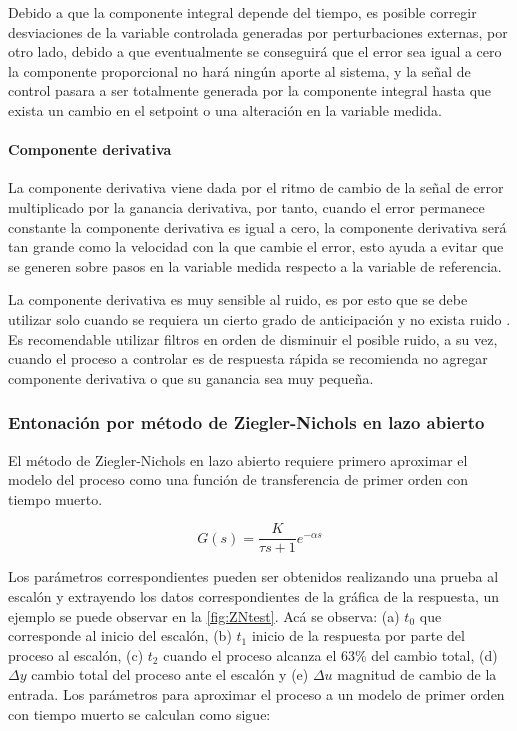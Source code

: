 				Debido a que la componente integral depende del tiempo, es posible corregir desviaciones de la variable controlada generadas por perturbaciones externas, por otro lado, debido a que eventualmente se conseguirá que el error sea igual a cero la componente proporcional no hará ningún aporte al sistema, y la señal de control pasara a ser totalmente generada por la componente integral hasta que exista un cambio en el setpoint o una alteración en la variable medida.

			\paragraph{Componente derivativa}

				La componente derivativa viene dada por el ritmo de cambio de la señal de error multiplicado por la ganancia derivativa, por tanto, cuando el error permanece constante la componente derivativa es igual a cero, la componente derivativa será tan grande como la velocidad con la que cambie el error, esto ayuda a evitar que se generen sobre pasos en la variable medida respecto a la variable de referencia.
				
				La componente derivativa es muy sensible al ruido, es por esto que se debe utilizar solo cuando se requiera un cierto grado de anticipación y no exista ruido \Parencite{smith1985principles}. Es recomendable utilizar filtros en orden de disminuir el posible ruido, a su vez, cuando el proceso a controlar es de respuesta rápida se recomienda no agregar componente derivativa o que su ganancia sea muy pequeña.
				
		\subsubsection{Entonación por método de Ziegler-Nichols en lazo abierto}
			
			El método de Ziegler-Nichols en lazo abierto requiere primero aproximar el modelo del proceso como una función de transferencia de primer orden con tiempo muerto.
			
			\begin{equation}\label{eq:firstorderProcess}
				G(s) = \frac{K}{\tau s + 1} e^{-\alpha s}
			\end{equation}
			
			Los parámetros correspondientes pueden ser obtenidos realizando una prueba al escalón y extrayendo los datos correspondientes de la gráfica de la respuesta, un ejemplo se puede observar en la \cref{fig:ZNtest}. Acá se observa: (a) $t_{0}$ que corresponde al inicio del escalón, (b) $t_{1}$ inicio de la respuesta por parte del proceso al escalón, (c) $t_{2}$ cuando el proceso alcanza el 63\% del cambio total, (d) $\Delta y$ cambio total del proceso ante el escalón y (e) $\Delta u$ magnitud de cambio de la entrada. Los parámetros para aproximar el proceso a un modelo de primer orden con tiempo muerto se calculan como sigue:
			
